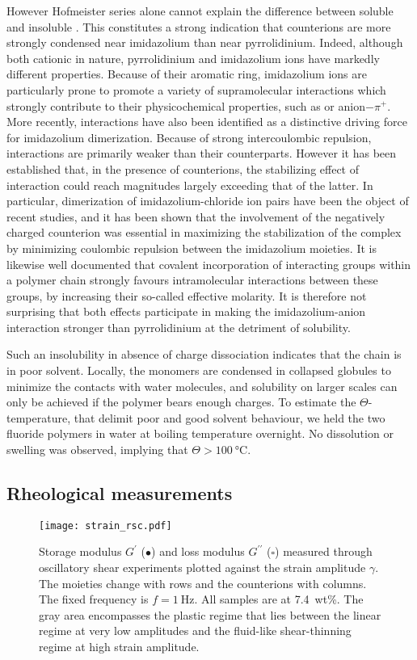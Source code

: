 \documentclass[twoside,twocolumn,9pt]{article}
\begin{document}
However Hofmeister series alone cannot explain the difference between soluble  and insoluble . This constitutes a strong indication that counterions are more strongly condensed near imidazolium than near pyrrolidinium. Indeed, although both cationic in nature, pyrrolidinium and imidazolium ions have markedly different properties. Because of their aromatic ring, imidazolium ions are particularly prone to promote a variety of supramolecular interactions which strongly contribute to their physicochemical properties, such as \ce{\pi+-\pi} or anion$-\pi^+$.  More recently, \ce{\pi+-\pi+} interactions have also been identified as a distinctive driving force for imidazolium dimerization\cite{Geronimo2011}. Because of strong intercoulombic repulsion, \ce{\pi+-\pi+} interactions are primarily weaker than their \ce{\pi-\pi} counterparts. However it has been established that, in the presence of counterions, the stabilizing effect of \ce{\pi+-\pi+} interaction could reach magnitudes largely exceeding that of the latter\cite{Geronimo2011}. In particular, dimerization of imidazolium-chloride ion pairs have been the object of recent studies, and it has been shown that the involvement of the negatively charged counterion was essential in maximizing the stabilization of the \ce{\pi+-\pi+} complex by minimizing coulombic repulsion between the imidazolium moieties\cite{Matthews2014,Gao2015a}. It is likewise well documented that covalent incorporation of interacting groups within a polymer chain strongly favours intramolecular interactions between these groups, by increasing their so-called effective molarity\cite{Li2003,Mulder2004,Huerta2013}. It is therefore not surprising that both effects participate in making the imidazolium-anion interaction stronger than pyrrolidinium at the detriment of solubility.

Such an insolubility in absence of charge dissociation indicates that the chain is in poor solvent. Locally, the monomers are condensed in collapsed globules to minimize the contacts with water molecules, and solubility on larger scales can only be achieved if the polymer bears enough charges\cite{Khokhlov1980,Raphael1990}. To estimate the $\Theta$-temperature, that delimit poor and good solvent behaviour, we held the two fluoride polymers in water at boiling temperature overnight. No dissolution or swelling was observed, implying that $\Theta>\SI{100}{\celsius}$.

\subsection{Rheological measurements}
\begin{figure*}
\texttt{[image: strain\_rsc.pdf]}%
\caption{Storage modulus $G^\prime$ ($\bullet$) and loss modulus $G^{\prime\prime}$ ($\square$) measured through oscillatory shear experiments plotted against the strain amplitude $\gamma$. The moieties change with rows and the counterions with columns. The fixed frequency is $f=\SI{1}{\hertz}$. All samples are at 7.4~wt\%. The gray area encompasses the plastic regime that lies between the linear regime at very low amplitudes and the fluid-like shear-thinning regime at high strain amplitude.}%
\label{fig:strain}%
\end{figure*}
\end{document}
